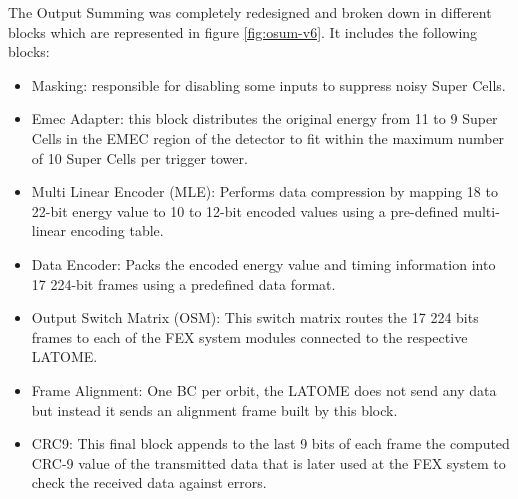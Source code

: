 The Output Summing was completely redesigned and broken down in different blocks which are represented in figure \ref{fig:osum-v6}. It includes the following blocks:
\begin{itemize}
    \item Masking: responsible for disabling some inputs to suppress noisy Super Cells.
    \item Emec Adapter: this block distributes the original energy from 11 to 9 Super Cells in the EMEC region of the detector to fit within the maximum number of 10 Super Cells per trigger tower.
    \item Multi Linear Encoder (MLE): Performs data compression by mapping 18 to 22-bit energy value to 10 to 12-bit encoded values using a pre-defined multi-linear encoding table.
    \item Data Encoder: Packs the encoded energy value and timing information into 17 224-bit frames using a predefined data format.
    \item Output Switch Matrix (OSM): This switch matrix routes the 17 224 bits frames to each of the FEX system modules connected to the respective LATOME.
    \item Frame Alignment: One BC per orbit, the LATOME does not send any data but instead it sends an alignment frame built by this block.
    \item CRC9: This final block appends to the last 9 bits of each frame the computed CRC-9 value of the transmitted data that is later used at the FEX system to check the received data against errors.
\end{itemize}